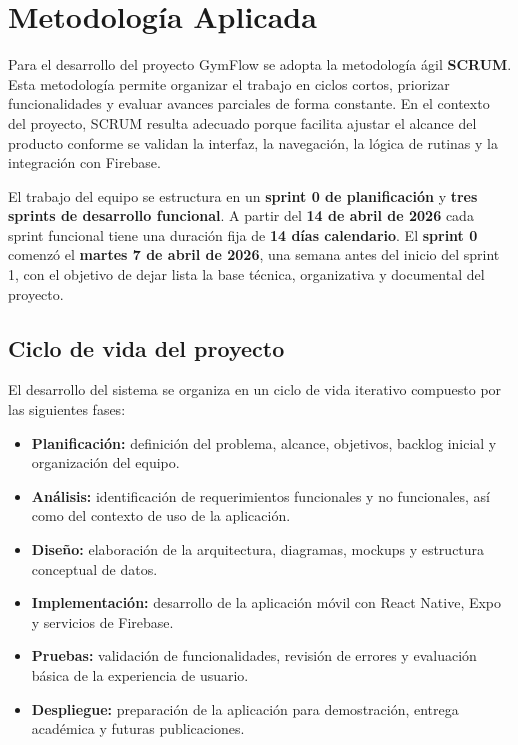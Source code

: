 \section{Metodología Aplicada}

Para el desarrollo del proyecto GymFlow se adopta la metodología ágil \textbf{SCRUM}. Esta metodología permite organizar el trabajo en ciclos cortos, priorizar funcionalidades y evaluar avances parciales de forma constante. En el contexto del proyecto, SCRUM resulta adecuado porque facilita ajustar el alcance del producto conforme se validan la interfaz, la navegación, la lógica de rutinas y la integración con Firebase.

El trabajo del equipo se estructura en un \textbf{sprint 0 de planificación} y \textbf{tres sprints de desarrollo funcional}. A partir del \textbf{14 de abril de 2026} cada sprint funcional tiene una duración fija de \textbf{14 días calendario}. El \textbf{sprint 0} comenzó el \textbf{martes 7 de abril de 2026}, una semana antes del inicio del sprint 1, con el objetivo de dejar lista la base técnica, organizativa y documental del proyecto.

\subsection{Ciclo de vida del proyecto}

El desarrollo del sistema se organiza en un ciclo de vida iterativo compuesto por las siguientes fases:

\begin{itemize}
\item \textbf{Planificación:} definición del problema, alcance, objetivos, backlog inicial y organización del equipo.
\item \textbf{Análisis:} identificación de requerimientos funcionales y no funcionales, así como del contexto de uso de la aplicación.
\item \textbf{Diseño:} elaboración de la arquitectura, diagramas, mockups y estructura conceptual de datos.
\item \textbf{Implementación:} desarrollo de la aplicación móvil con React Native, Expo y servicios de Firebase.
\item \textbf{Pruebas:} validación de funcionalidades, revisión de errores y evaluación básica de la experiencia de usuario.
\item \textbf{Despliegue:} preparación de la aplicación para demostración, entrega académica y futuras publicaciones.
\end{itemize}

